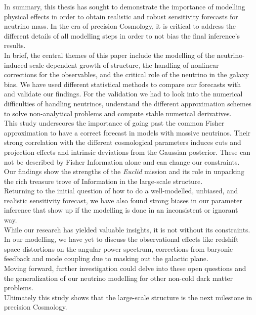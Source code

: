\documentclass[oneside]{book}
\newcommand*{\Euclid}{\textit{Euclid}\xspace}
\begin{document}
In summary, this thesis has sought to demonstrate the importance of modelling physical effects in order to obtain realistic and robust sensitivity forecasts for neutrino mass. In the era of precision Cosmology, it is critical to address the different details of all modelling steps in order to not bias the final inference's results.\\
In brief, the central themes of this paper include the modelling of the neutrino-induced scale-dependent growth of structure, the handling of nonlinear corrections for the observables, and the critical role of the neutrino in the galaxy bias. We have used different statistical methods to compare our forecasts with and validate our findings. For the validation we had to look into the numerical difficulties of handling neutrinos, understand the different approximation schemes to solve non-analytical problems and compute stable numerical derivatives.\\
This study underscores the importance of going past the common Fisher approximation to have a correct forecast in models with massive neutrinos. Their strong correlation with the different cosmological parameters induces cuts and projection effects and intrinsic deviations from the Gaussian posterior. These can not be described by Fisher Information alone and can change our constraints. Our findings show the strengths of the \Euclid mission and its role in unpacking the rich treasure trove of Information in the large-scale structure.\\
Returning to the initial question of how to do a well-modelled, unbiased, and realistic sensitivity forecast, we have also found strong biases in our parameter inference that show up if the modelling is done in an inconsistent or ignorant way.\\
While our research has yielded valuable insights, it is not without its constraints. In our modelling, we have yet to discuss the observational effects like redshift space distortions on the angular power spectrum, corrections from baryonic feedback and mode coupling due to masking out the galactic plane.\\
Moving forward, further investigation could delve into these open questions and the generalization of our neutrino modelling for other non-cold dark matter problems.\\
Ultimately this study shows that the large-scale structure is the next milestone in precision Cosmology. 


\end{document}
